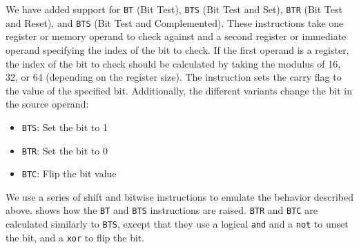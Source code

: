 We have added support for \texttt{BT} (Bit Test), \texttt{BTS} (Bit Test and Set), \texttt{BTR} (Bit Test and Reset), and \texttt{BTS} (Bit Test and Complemented).
These instructions take one register or memory operand to check against and a second register or immediate operand specifying the index of the bit to check.
If the first operand is a register, the index of the bit to check should be calculated by taking the modulus of 16, 32, or 64 (depending on the register size).
The instruction sets the carry flag to the value of the specified bit.
Additionally, the different variants change the bit in the source operand:
\begin{itemize}
    \item \texttt{BTS}: Set the bit to 1
    \item \texttt{BTR}: Set the bit to 0
    \item \texttt{BTC}: Flip the bit value
\end{itemize}

We use a series of shift and bitwise instructions to emulate the behavior described above.
 shows how the \texttt{BT} and \texttt{BTS} instructions are raised.
\texttt{BTR} and \texttt{BTC} are calculated similarly to \texttt{BTS}, except that they use a logical \texttt{and} and a \texttt{not} to unset the bit, and a \texttt{xor} to flip the bit.

